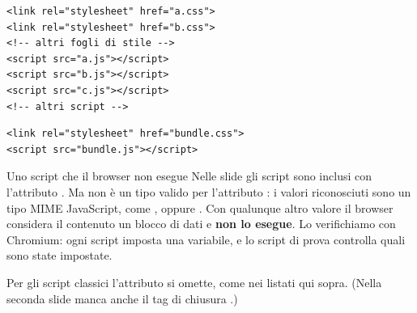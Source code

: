 \begin{affianco}[0.5]
\begin{lstlisting}[style=html, name=prima.html]
<link rel="stylesheet" href="a.css">
<link rel="stylesheet" href="b.css">
<!-- altri fogli di stile -->
<script src="a.js"></script>
<script src="b.js"></script>
<script src="c.js"></script>
<!-- altri script -->
\end{lstlisting}
\risultato
\begin{lstlisting}[style=html, name=dopo.html]
<link rel="stylesheet" href="bundle.css">
<script src="bundle.js"></script>
\end{lstlisting}
\end{affianco}


\begin{warningbox}{{Uno script che il browser non esegue}}
  Nelle slide gli script sono inclusi con l'attributo
  . Ma  non è un tipo valido per l'attributo
  : i valori riconosciuti sono un tipo MIME JavaScript, come
  , oppure . Con qualunque altro valore il
  browser considera il contenuto un blocco di dati e \textbf{non lo esegue}. Lo
  verifichiamo con Chromium: ogni script imposta una variabile, e lo script di
  prova controlla quali sono state impostate.


  Per gli script classici l'attributo si omette, come nei listati qui sopra.
  (Nella seconda slide manca anche il tag di chiusura .)
\end{warningbox}


